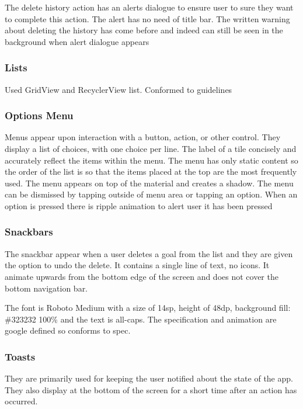 \documentclass[12pt]{report}
\begin{document}
The delete history action has an alerts dialogue to ensure user to sure they want to complete this action. The alert has no need of title bar. The written warning about deleting the history has come before and indeed can still be seen in the background when alert dialogue appears

\subsubsection{Lists}

Used GridView and RecyclerView list. Conformed to guidelines

\subsubsection{Options Menu}

Menus appear upon interaction with a button, action, or other control. They display a list of choices, with one choice per line. The label of a tile concisely and accurately reflect the items within the menu. The menu has only static content so the order of the list is so that the items placed at the top are the most frequently used.
The menu appears on top of the material and creates a shadow.
The menu can be dismissed by tapping outside of menu area or tapping an option.
When an option is pressed there is ripple animation to alert user it has been pressed

\subsubsection{Snackbars}
The snackbar appear when a user deletes a goal from the list and they are given the option to undo the delete. It contains a single line of text, no icons. It animate upwards from the bottom edge of the screen and does not cover the bottom navigation bar.

The font is Roboto Medium with a size of 14sp, height of 48dp, background fill: \#323232 100\% and the text is all-caps.
The specification and animation are google defined so conforms to spec.

\subsubsection{Toasts}

They are primarily used for keeping the user notified about the state of the app. They also display at the bottom of the screen for a short time after an action has occurred. 
\end{document}
